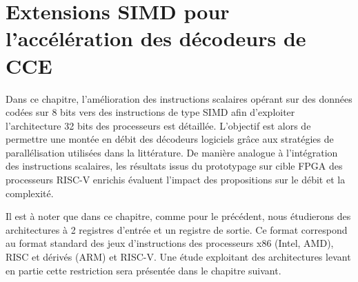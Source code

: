 \documentclass[../main.tex]{subfiles}
\begin{document}
%
%
%
%
%
\chapter{Extensions SIMD pour l'accélération des décodeurs de CCE} 
\label{chapter:3_2}

Dans ce chapitre, l'amélioration des instructions scalaires opérant sur des données codées sur 8 bits vers des instructions de type SIMD afin d'exploiter l'architecture 32 bits des processeurs est détaillée. 
L'objectif est alors de permettre une montée en débit des décodeurs logiciels grâce aux stratégies de parallélisation utilisées dans la littérature.
De manière analogue à l'intégration des instructions scalaires, les résultats issus du prototypage sur cible FPGA des processeurs RISC-V enrichis évaluent l'impact des propositions sur le débit et la complexité.

Il est à noter que dans ce chapitre, comme pour le précédent, nous étudierons des architectures à 2 registres d'entrée et un registre de sortie. Ce format correspond au format standard des jeux d'instructions des processeurs x86 (Intel, AMD), RISC et dérivés (ARM) et RISC-V. Une étude exploitant des architectures levant en partie cette restriction sera présentée dans le chapitre suivant.

\etocsettocstyle{{\large \hspace{-1.5 em} \textbf{} \hfill}\vspace{-2.5 em}\\\par\noindent\rule{\linewidth}{1 pt}\vspace{-.2 em}}{\par\noindent\rule{\linewidth}{1 pt}\\}
\localtableofcontents
%
%
%
%
%
% 
% 
\end{document}
